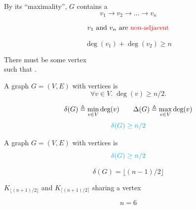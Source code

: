 \begin{frame}{}
  \begin{center}
    By its ``maximality'', $G$ contains a  \\[3pt]
    \[
      v_{1} \to v_{2} \to \dots \to v_{n}
    \]

    \pause
    \vspace{-0.60cm}
    \[
      v_{1} \text{ and } v_{n} \text{ are \textcolor{red}{non-adjacent}}
    \]

    \pause
    \vspace{-0.60cm}
    \[
      \deg(v_{1}) + \deg(v_{2}) \ge n
    \]

    \pause
    There must be some vertex  \\[3pt]
    such that .
  \end{center}
\end{frame}

\begin{frame}{}
  \begin{theorem}
    A  graph $G = (V, E)$
    with  vertices is 
    \[
      \forall v \in V.\; \deg(v) \ge n/2.
    \]
  \end{theorem}

  \pause
  \[
    \delta(G) \triangleq \min_{v \in V} \text{deg}(v)
    \qquad
    \Delta(G) \triangleq \max_{v \in V} \text{deg}(v)
  \]
  \[
    \textcolor{cyan}{\delta(G) \ge n/2}
  \]

  \pause
\end{frame}

\begin{frame}{}
  \begin{theorem}
    A  graph $G = (V, E)$
    with  vertices is 
    \[
      \textcolor{cyan}{\delta(G) \ge n/2}
    \]
  \end{theorem}

  \pause
  \[
    \delta(G) = \lfloor (n-1)/2 \rfloor
  \]

  \pause
  \vspace{0.30cm}
  \begin{center}
    $K_{\lfloor (n + 1)/ 2 \rfloor}$ and $K_{\lceil (n+1)/2 \rceil}$
    sharing a vertex
  \end{center}

  \pause
  \[
    n = 6
  \]
\end{frame}
